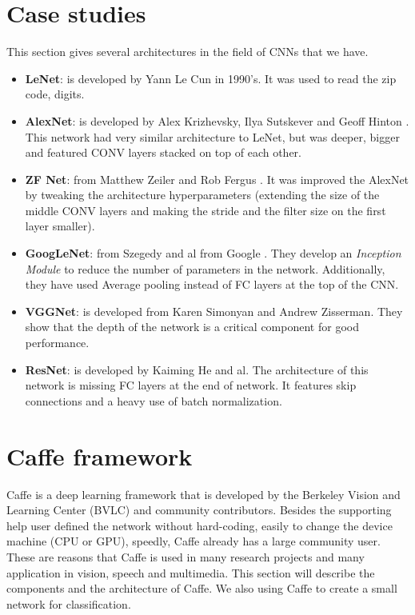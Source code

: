 \section{Case studies}
This section gives several architectures in the field of CNNs that we have.
\begin{itemize}
	\item \textbf{LeNet}: is developed by Yann Le Cun \cite{lecun1998gradient} in 1990's. It was used to read the zip code, digits.
	\item \textbf{AlexNet}: is developed by Alex Krizhevsky, Ilya Sutskever and Geoff Hinton \cite{krizhevsky2012imagenet}. This network had very similar architecture to LeNet, but was deeper, bigger and featured CONV layers stacked on top of each other.
	\item \textbf{ZF Net}: from Matthew Zeiler and Rob Fergus \cite{zeiler2014visualizing}. It was improved the AlexNet by tweaking the architecture hyperparameters (extending the size of the middle CONV layers and making the stride and the filter size on the first layer smaller).
	\item \textbf{GoogLeNet}: from Szegedy and al from Google \cite{szegedy2015going}. They develop an \textit{Inception Module} to reduce the number of parameters in the network. Additionally, they have used Average pooling instead of FC layers at the top of the CNN.
	\item \textbf{VGGNet}: is developed from Karen Simonyan and Andrew Zisserman\cite{simonyan2014very}. They show that the depth of the network is a critical component for good performance.
	\item \textbf{ResNet}: is developed by Kaiming He and al\cite{he2015deep}. The architecture of this network is missing FC layers at the end of network. It features skip connections and a heavy use of batch normalization\cite{ioffe2015batch}.
\end{itemize}
\section{Caffe framework}
Caffe is a deep learning framework that is developed by the Berkeley Vision and Learning Center (BVLC) and community contributors. Besides the supporting help user defined the network without hard-coding, easily to change the device machine (CPU or GPU), speedly, Caffe already has a large community user. These are reasons that Caffe is used in many research projects and many application in vision, speech and multimedia. This  section will describe the components and the architecture of Caffe. We also using Caffe to create a small network for classification.
